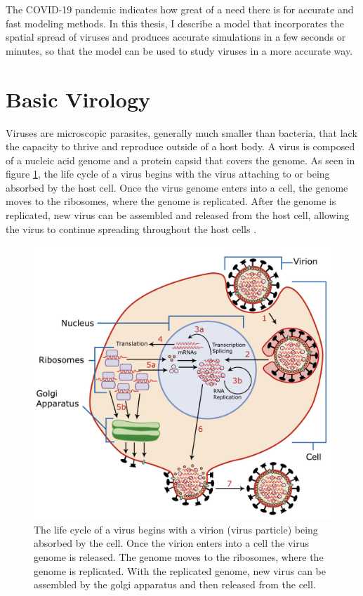 The COVID-19 pandemic indicates how great of a need there is for accurate and fast modeling methods. In this thesis, I describe a model that incorporates the spatial spread of viruses and produces accurate simulations in a few seconds or minutes, so that the model can be used to study viruses in a more accurate way. 

\section{Basic Virology}
Viruses are microscopic parasites, generally much smaller than bacteria, that lack the capacity to thrive and reproduce outside of a host body. A virus is composed of a nucleic acid genome and a protein capsid that covers the genome. As seen in figure \ref{fig:Virus_Replication}, the life cycle of a virus begins with the virus attaching to or being absorbed by the host cell. Once the virus genome enters into a cell, the genome moves to the ribosomes, where the genome is replicated. After the genome is replicated, new virus can be assembled and released from the host cell, allowing the virus to continue spreading throughout the host cells \citep{openstax_microbiology_2016}.

\begin{figure}[h]
    \centering
    \includegraphics[width=0.6\linewidth]{Figures/Virus_Replication_large.pdf}
    \caption{The life cycle of a virus begins with a virion (virus particle) being absorbed by the cell. Once the virion enters into a cell the virus genome is released. The genome moves to the ribosomes, where the genome is replicated. With the replicated genome, new virus can be assembled by the golgi apparatus and then released from the cell.}
    \label{fig:Virus_Replication}
\end{figure}

